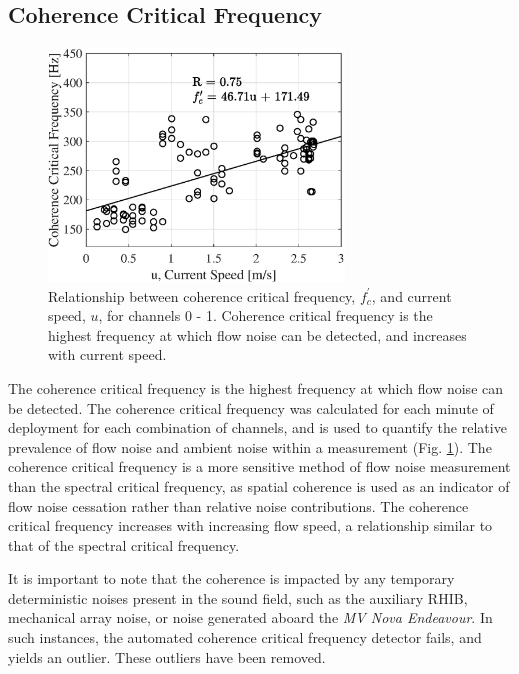 \documentclass[12pt,journal,onecolumn]{IEEEtran}
\begin{document}
\subsection{Coherence Critical Frequency}
\begin{figure}[!t]
	\begin{center}
		\includegraphics[width=0.7\textwidth]{figure6.eps}
	\end{center}%
	\caption[Spatial coherence thresholding results.]{
	\label{f:c_thresh}
	Relationship between coherence critical frequency, $f^\prime_c$, and current speed, $u$, for channels 0 - 1. Coherence critical frequency is the highest frequency at which flow noise can be detected, and increases with current speed. }
\end{figure}
The coherence critical frequency is the highest frequency at which flow noise can be detected. The coherence critical frequency was calculated for each minute of deployment for each combination of channels, and is used to quantify the relative prevalence of flow noise and ambient noise within a measurement (Fig. \ref{f:c_thresh}). The coherence critical frequency is a more sensitive method of flow noise measurement than the spectral critical frequency, as spatial coherence is used as an indicator of flow noise cessation rather than relative noise contributions. The coherence critical frequency increases with increasing flow speed, a relationship similar to that of the spectral critical frequency. 

It is important to note that the coherence is impacted by any temporary deterministic noises present in the sound field, such as the auxiliary RHIB, mechanical array noise, or noise generated aboard the \emph{MV Nova Endeavour}. In such instances, the automated coherence critical frequency detector fails, and yields an outlier. These outliers have been removed.
\end{document}
